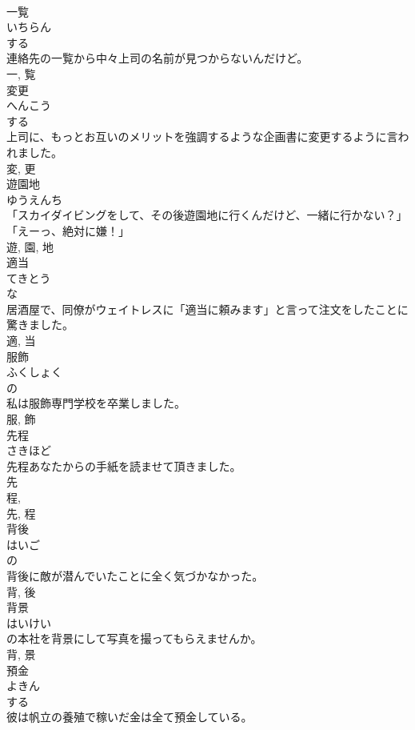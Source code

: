 \documentclass[8pt]{extreport}
\begin{document}
\begin{CJK}{UTF8}{min}
\\	一覧	
\\	いちらん	
\\	する 
\\	連絡先の一覧から中々上司の名前が見つからないんだけど。	
\\	一, 覧	
\\	変更	
\\	へんこう	
\\	する 
\\	上司に、もっとお互いのメリットを強調するような企画書に変更するように言われました。	
\\	変, 更	
\\	遊園地	
\\	ゆうえんち	
\\	「スカイダイビングをして、その後遊園地に行くんだけど、一緒に行かない？」「えーっ、絶対に嫌！」	
\\	遊, 園, 地	
\\	適当	
\\	てきとう	
\\	な 
\\	居酒屋で、同僚がウェイトレスに「適当に頼みます」と言って注文をしたことに驚きました。	
\\	適, 当	
\\	服飾	
\\	ふくしょく	
\\	の 
\\	私は服飾専門学校を卒業しました。	
\\	服, 飾	
\\	先程	
\\	さきほど	
\\	先程あなたからの手紙を読ませて頂きました。	
\\	先 
\\	程, 
\\	先, 程	
\\	背後	
\\	はいご	
\\	の 
\\	背後に敵が潜んでいたことに全く気づかなかった。	
\\	背, 後	
\\	背景	
\\	はいけい	
\\	の本社を背景にして写真を撮ってもらえませんか。	
\\	背, 景	
\\	預金	
\\	よきん	
\\	する 
\\	彼は帆立の養殖で稼いだ金は全て預金している。	

\end{CJK}
\end{document}
